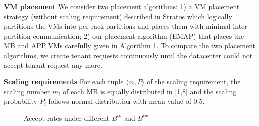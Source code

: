 \documentclass[review]{elsarticle}
\begin{document}
\textbf{VM placement} We consider two placement algorithms: 1) a VM placement strategy (without scaling requirement) described in Stratos \cite{stratos12} which logically partitions the VMs into per-rack partitions and places them with minimal inter-partition communication; 2) our placement algorithm (EMAP) that places the MB and APP VMs carefully given in Algorithm 1. To compare the two placement algorithms, we create tenant requests continuously until the datacenter could not accept tenant request any more.

\textbf{Scaling requirements} For each tuple $\langle m, P\rangle$ of the scaling requirement, the scaling number $m_i$ of each MB is equally distributed in [1,8] and the scaling probability $P_i$ follows normal distribution with mean value of 0.5. 



\begin{figure}[H]
	\centering
	
	\caption{Accept rates under different $B^{in}$ and $ B^{ex}$}
	\label{fig:accept_rate}
\end{figure}
\end{document}
